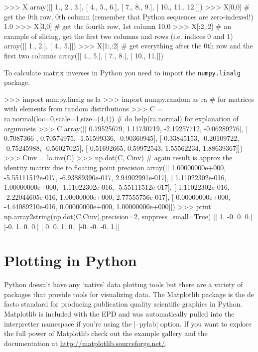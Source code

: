 \begin{python}
>>> X
array([[  1.,   2.,   3.],
       [  4.,   5.,   6.],
       [  7.,   8.,   9.],
       [ 10.,  11.,  12.]])
>>> X[0,0] # get the 0th row, 0th column (remember that Python sequences are zero-indexed!)
1.0
>>> X[3,0] # get the fourth row, 1st column
10.0
>>> X[:2,:2]  # an example of slicing, get the first two columns and rows (i.e. indices 0 and 1)
array([[ 1.,  2.],
       [ 4.,  5.]])
>>> X[1:,:2] # get everything after the 0th row and  the first two columns
array([[  4.,   5.],
       [  7.,   8.],
       [ 10.,  11.]])
\end{python}
To calculate matrix inverses in Python you need to import the
\lstinline!numpy.linalg! package.

\begin{python}
>>> import numpy.linalg as la
>>> import numpy.random as ra  # for matrices with elements from random distributions
>>> C = ra.normal(loc=0,scale=1,size=(4,4)) # do help(ra.normal) for explanation of argumnets
>>> C
array([[ 0.79525679,  1.11730719, -2.19257712, -0.06289276],
       [ 0.7087366 ,  0.70574975, -1.51599336, -0.90360945],
       [-0.33845153, -0.20109722, -0.75245988, -0.56027025],
       [-0.51692665,  0.59972543,  1.55562234,  1.88639367]])
>>> Cinv = la.inv(C)
>>> np.dot(C, Cinv) # again result is approx the identity matrix due to floating point precision
array([[ 1.00000000e+000, -5.55111512e-017, -6.93889390e-017,  2.94902991e-017],
       [ 1.11022302e-016,  1.00000000e+000, -1.11022302e-016, -5.55111512e-017],
       [ 1.11022302e-016, -2.22044605e-016,  1.00000000e+000,  2.77555756e-017],
       [ 0.00000000e+000, -4.44089210e-016,  0.00000000e+000,  1.00000000e+000]])
>>> print np.array2string(np.dot(C,Cinv),precision=2, suppress_small=True)
[[ 1. -0.  0.  0.]
 [-0.  1.  0.  0.]
 [ 0.  0.  1.  0.]
 [-0. -0. -0.  1.]]
\end{python}




\section{Plotting in Python}

Python doesn't have any `native' data plotting tools but there are a
variety of packages that provide tools for visualizing data. The Matplotlib package is the de facto standard for producing
publication quality scientific graphics in Python. Matplotlib is
included with the EPD and was automatically pulled into the interpretter
namespace if you're using the \ipython |--pylab| option. If you want to explore the full power of Matplotlib check out the example
gallery and the documentation at
\url{http://matplotlib.sourceforge.net/}.


